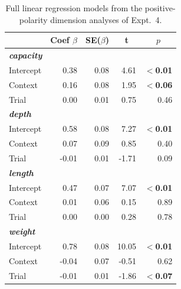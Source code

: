 \documentclass[preprint,12pt,authoryear,titlepage]{elsarticle}
\begin{document}
\begin{table}[htb] 
	\renewcommand\thetable{D.1}
	\centering \caption{Full linear regression models from the positive-polarity dimension analyses of Expt.~4.} \label{expt4analysisa}
	\begin{tabular}{lrrrr}\toprule
		&	Coef $\beta$	&	SE($\beta$)	&	\multicolumn{1}{c}{ \textbf{t}}	&	\multicolumn{1}{c}{$p$}\\ \midrule
		\emph{\textbf{capacity}} \\
		Intercept 		& 	0.38 	&	0.08	&	4.61	&	\textbf{$<$0.01} \\
		Context			&	0.16	&   0.08	&	1.95	&	\textbf{$<$0.06} \\
		Trial			&	0.00	&   0.01	&	0.75	&	0.46 \\\hline
		\emph{\textbf{depth}}\\
		Intercept 		& 	0.58 	&	0.08	&	7.27	&	\textbf{$<$0.01} \\
		Context			&	0.07	&   0.09	&	0.85	&	0.40\\
		Trial			&	-0.01	&   0.01	&	-1.71	&	0.09 \\\hline
		\emph{\textbf{length}}\\
		Intercept 		& 	0.47 	&	0.07	&	7.07	&	\textbf{$<$0.01} \\
		Context			&	0.01	&   0.06	&	0.15	&	0.89 \\
		Trial			&	0.00	&   0.00	&	0.28	&	0.78 \\ \hline
		\emph{\textbf{weight}}\\
		Intercept 		& 	0.78 	&	0.08	&	10.05	&	\textbf{$<$0.01} \\
		Context			&	-0.04	&   0.07	&	-0.51	&	0.62 \\
		Trial			&	-0.01	&   0.01	&	-1.86	&	\textbf{$<$0.07} \\
		\bottomrule
	\end{tabular}
\end{table}
\end{document}
